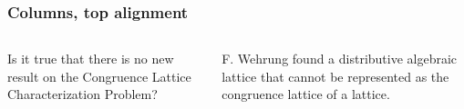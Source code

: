 \documentclass{beamer}
\begin{document}
\begin{frame}
\frametitle{Columns, top alignment}

\begin{columns}[t]
  \begin{column}{2in}
Is it true that there is no new result on the Congruence Lattice Characterization Problem?
  \end{column}
    \begin{column}{2in}
F. Wehrung found a distributive algebraic lattice that cannot be represented as the congruence lattice of a lattice.
  \end{column}
\end{columns}
\end{frame}
\end{document}
